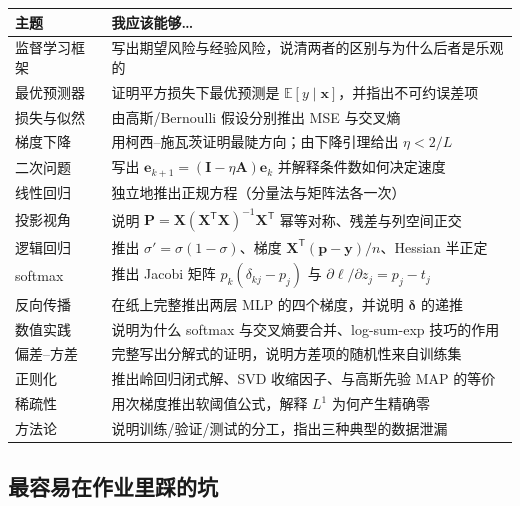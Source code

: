 \documentclass[UTF8,a4paper,11pt]{ctexart}
\theoremstyle{definition}
\theoremstyle{plain}
\theoremstyle{remark}
\newcommand{\E}{\mathbb{E}}
\newcommand{\T}{^{\mathsf{T}}}
\begin{document}
\begin{center}
\begin{tabular}{@{}p{}p{}@{}}
\toprule
主题 & 我应该能够…\\
\midrule
监督学习框架 & 写出期望风险与经验风险，说清两者的区别与为什么后者是乐观的\\
最优预测器 & 证明平方损失下最优预测是 $\E[y\mid\bm{x}]$，并指出不可约误差项\\
损失与似然 & 由高斯/Bernoulli 假设分别推出 MSE 与交叉熵\\
梯度下降 & 用柯西--施瓦茨证明最陡方向；由下降引理给出 $\eta<2/L$\\
二次问题 & 写出 $\bm{e}_{k+1}=(\bm{I}-\eta\bm{A})\bm{e}_k$ 并解释条件数如何决定速度\\
线性回归 & 独立地推出正规方程（分量法与矩阵法各一次）\\
投影视角 & 说明 $\bm{P}=\bm{X}(\bm{X}\T\bm{X})^{-1}\bm{X}\T$ 幂等对称、残差与列空间正交\\
逻辑回归 & 推出 $\sigma'=\sigma(1-\sigma)$、梯度 $\bm{X}\T(\bm{p}-\bm{y})/n$、Hessian 半正定\\
softmax & 推出 Jacobi 矩阵 $p_k(\delta_{kj}-p_j)$ 与 $\partial\ell/\partial z_j=p_j-t_j$\\
反向传播 & 在纸上完整推出两层 MLP 的四个梯度，并说明 $\bm{\delta}$ 的递推\\
数值实践 & 说明为什么 softmax 与交叉熵要合并、log-sum-exp 技巧的作用\\
偏差--方差 & 完整写出分解式的证明，说明方差项的随机性来自训练集\\
正则化 & 推出岭回归闭式解、SVD 收缩因子、与高斯先验 MAP 的等价\\
稀疏性 & 用次梯度推出软阈值公式，解释 $L^1$ 为何产生精确零\\
方法论 & 说明训练/验证/测试的分工，指出三种典型的数据泄漏\\
\bottomrule
\end{tabular}
\end{center}

\subsection{最容易在作业里踩的坑}
\end{document}
